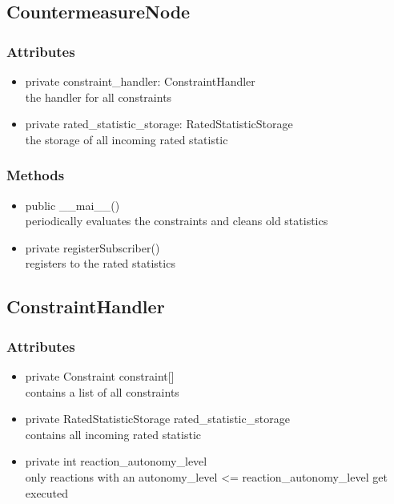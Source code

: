 \subsection{CountermeasureNode}
\subsubsection{Attributes}
\begin{itemize}
	\item  private constraint\_handler: ConstraintHandler\\
		the handler for all constraints
	\item  private rated\_statistic\_storage: RatedStatisticStorage\\
		the storage of all incoming rated statistic
\end{itemize}
\subsubsection{Methods}
\begin{itemize}
	\item  public \_\_mai\_\_()\\
		periodically evaluates the constraints and cleans old statistics
	\item private registerSubscriber()\\
		registers to the rated statistics
\end{itemize}



\subsection{ConstraintHandler}
\subsubsection{Attributes}
\begin{itemize}
	\item private  Constraint constraint[]\\
		contains a list of all constraints
	\item private  RatedStatisticStorage rated\_statistic\_storage\\
		contains all incoming rated statistic
	\item private  int reaction\_autonomy\_level\\
		only reactions with an autonomy\_level <= reaction\_autonomy\_level get executed
\end{itemize}
